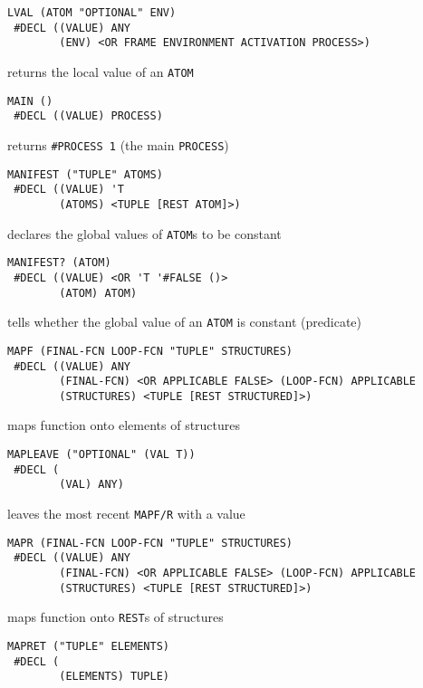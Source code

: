 \documentclass[a4paper]{scrbook}
\begin{document}
\begin{verbatim}
LVAL (ATOM "OPTIONAL" ENV)
 #DECL ((VALUE) ANY
        (ENV) <OR FRAME ENVIRONMENT ACTIVATION PROCESS>)
\end{verbatim}

returns the local value of an \texttt{ATOM}

\begin{verbatim}
MAIN ()
 #DECL ((VALUE) PROCESS)
\end{verbatim}

returns \texttt{\#PROCESS\ 1} (the main \texttt{PROCESS})

\begin{verbatim}
MANIFEST ("TUPLE" ATOMS)
 #DECL ((VALUE) 'T
        (ATOMS) <TUPLE [REST ATOM]>)
\end{verbatim}

declares the global values of \texttt{ATOM}s to be constant

\begin{verbatim}
MANIFEST? (ATOM)
 #DECL ((VALUE) <OR 'T '#FALSE ()>
        (ATOM) ATOM)
\end{verbatim}

tells whether the global value of an \texttt{ATOM} is constant (predicate)

\begin{verbatim}
MAPF (FINAL-FCN LOOP-FCN "TUPLE" STRUCTURES)
 #DECL ((VALUE) ANY
        (FINAL-FCN) <OR APPLICABLE FALSE> (LOOP-FCN) APPLICABLE
        (STRUCTURES) <TUPLE [REST STRUCTURED]>)
\end{verbatim}

maps function onto elements of structures

\begin{verbatim}
MAPLEAVE ("OPTIONAL" (VAL T))
 #DECL (
        (VAL) ANY)
\end{verbatim}

leaves the most recent \texttt{MAPF/R} with a value

\begin{verbatim}
MAPR (FINAL-FCN LOOP-FCN "TUPLE" STRUCTURES)
 #DECL ((VALUE) ANY
        (FINAL-FCN) <OR APPLICABLE FALSE> (LOOP-FCN) APPLICABLE
        (STRUCTURES) <TUPLE [REST STRUCTURED]>)
\end{verbatim}

maps function onto \texttt{REST}s of structures

\begin{verbatim}
MAPRET ("TUPLE" ELEMENTS)
 #DECL (
        (ELEMENTS) TUPLE)
\end{verbatim}
\end{document}
